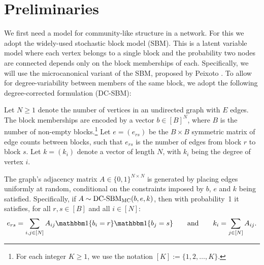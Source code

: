 \section{Preliminaries}

We first need a model for community-like structure in a network. For this we adopt the widely-used stochastic block model (SBM). This is a latent variable model where each vertex belongs to a single block and the probability two nodes are connected depends only on the block memberships of each.
Specifically, we will use the microcanonical variant of the SBM, proposed by Peixoto \cite{Peixoto-Bayesian-Microcanonical}. To allow for degree-variability between members of the same block, we adopt the following degree-corrected 
formulation (DC-SBM):

\begin{definition}
	\label{defn:microcan-dc-sbm}
	Let $N \geq 1$ denote the number of vertices in an undirected graph
with $E$ edges. The block memberships are encoded by a vector $b \in [B]^N$,
where $B$ is the number of non-empty blocks.\footnote{For each integer $K\geq 1$, we use the notation $[K]:=\{1,2,\ldots,K\}$.}
	Let $e=(e_{rs})$ be the $B \times B$ symmetric matrix of edge counts 
between blocks, such that $e_{rs}$ is the number of edges from block $r$ to 
block $s$. 
	Let $k =(k_i)$ denote a vector of length $N$, with $k_i$ being the degree of vertex $i$.

The graph's adjacency matrix $A \in \{0,1\}^{N \times N}$ is generated 
by placing edges uniformly at random, conditional
on the constraints imposed by $b$, $e$ and $k$ being satisfied.
Specifically, if $A \sim \mbox{\rm DC-SBM}_{\rm MC} (b, e, k)$,
then with probability~1 it satisfies,
for all $r,s\in[B]$
and all $i\in[N]$:
	\begin{equation}
		e_{rs} = \sum_{i, j \in [N]} A_{ij} 
	\one \{b_i = r\} \one \{b_j = s\} 
		\qquad 
		\textrm{and} \qquad
		k_i = \sum_{j \in [N]} A_{ij}.
		\label{eqn:sbm-constraints}
	\end{equation}
\end{definition}
